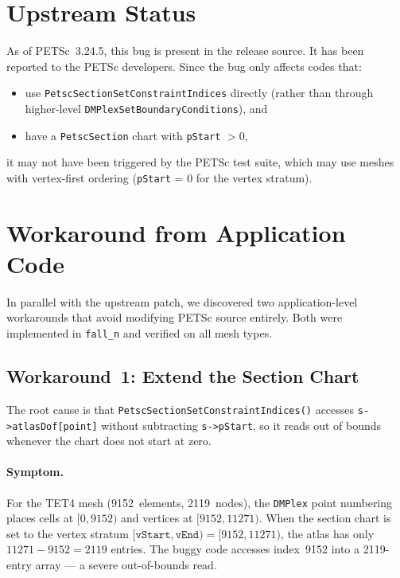 \section{Upstream Status}

As of PETSc~3.24.5, this bug is present in the release source.  It has been
reported to the PETSc developers.  Since the bug only affects codes that:
\begin{itemize}[nosep]
  \item use \texttt{PetscSectionSetConstraintIndices} directly (rather than
        through higher-level \texttt{DMPlexSetBoundaryConditions}), and
  \item have a \texttt{PetscSection} chart with \texttt{pStart} $> 0$,
\end{itemize}
it may not have been triggered by the PETSc test suite, which may use meshes
with vertex-first ordering (\texttt{pStart} = 0 for the vertex stratum).


\section{Workaround from Application Code}
\label{sec:workaround}

In parallel with the upstream patch, we discovered two application-level
workarounds that avoid modifying PETSc source entirely.  Both were implemented
in \texttt{fall\_n} and verified on all mesh types.

\subsection{Workaround~1: Extend the Section Chart}
\label{sec:workaround_chart}

The root cause is that \texttt{PetscSectionSetConstraintIndices()} accesses
\texttt{s->atlasDof[point]} without subtracting \texttt{s->pStart}, so it
reads out of bounds whenever the chart does not start at zero.

\paragraph{Symptom.}
For the TET4 mesh (9152~elements, 2119~nodes), the \texttt{DMPlex} point
numbering places cells at $[0, 9152)$ and vertices at $[9152, 11271)$.
When the section chart is set to the vertex stratum
$[\texttt{vStart}, \texttt{vEnd}) = [9152, 11271)$, the atlas has only
$11271 - 9152 = 2119$ entries.  The buggy code accesses index~9152 into a
2119-entry array --- a severe out-of-bounds read.

